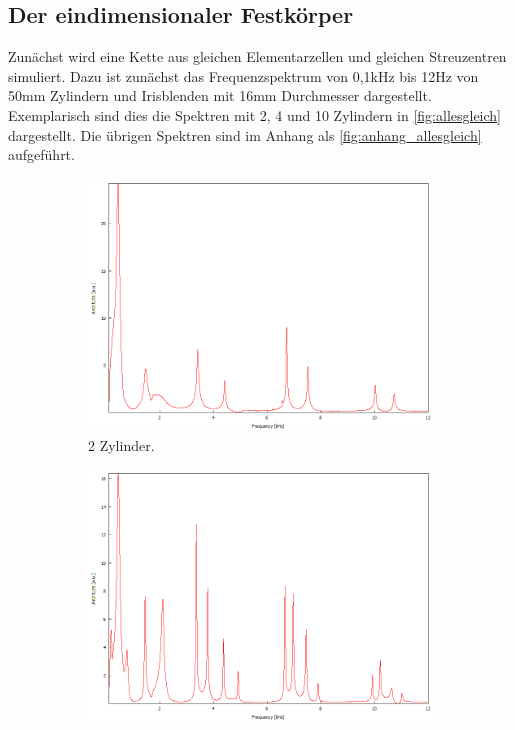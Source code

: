 \subsection{Der eindimensionaler Festkörper}
Zunächst wird eine Kette aus gleichen Elementarzellen und gleichen Streuzentren simuliert.
Dazu ist zunächst das Frequenzspektrum von 0,1\;kHz bis 12\;Hz von 50\;mm Zylindern und
Irisblenden mit 16\;mm Durchmesser dargestellt. Exemplarisch sind dies die Spektren mit 
2, 4 und 10 Zylindern in \autoref{fig:allesgleich} dargestellt. Die übrigen Spektren sind im 
Anhang als \autoref{fig:anhang_allesgleich} aufgeführt. 
\begin{figure}
    \centering
    \begin{subfigure}[b]{0.3\textwidth}
        \centering
        \includegraphics[width=\textwidth]{data/4_1/2.png}
        \caption{2 Zylinder.}
    \end{subfigure}
    \hfill
    \begin{subfigure}[b]{0.3\textwidth}
        \centering
        \includegraphics[width=\textwidth]{data/4_1/4.png}

\end{subfigure}
\end{figure}
